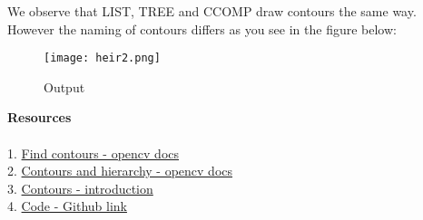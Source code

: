 \documentclass[]{article}
\begin{document}
\newpage
We observe that LIST, TREE and CCOMP draw contours the same way. However
the naming of contours differs as you see in the figure below:\\
\begin{figure}
\centering
\texttt{[image: heir2.png]} 
\caption{Output}
\end{figure}

\newpage
\LARGE{\textbf{Resources}} \\
\\
1. \href{http://docs.opencv.org/modules/imgproc/doc/structural
\_analysis\_and\_shape\_descriptors.html\#findcontours}{Find contours - opencv docs} \\
2. \href{http://docs.opencv.org/trunk/d9/d8b/tutorial\_py\_contours
\_hierarchy.html}{Contours and hierarchy - opencv docs} \\
3. \href{http://opencv-python-tutroals.readthedocs.org/en/latest/py
\_tutorials/py\_imgproc/py\_contours/py\_contours\_begin/py
\_contours\_begin.html\#contours-getting-started}{Contours - introduction}    \\    
4.    \href{https://github.com/eyantrainternship/eYSIP_2015_Marker_based_Robot_Localisation/blob/master/Task-4/src/shape_detection.py.py}{Code - Github link}
\end{document}
